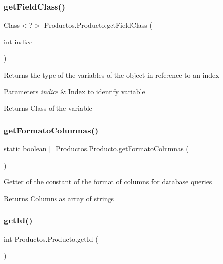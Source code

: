\subsubsection{\texorpdfstring{get\+Field\+Class()}{getFieldClass()}}
{\footnotesize\ttfamily Class$<$?$>$ Productos.\+Producto.\+get\+Field\+Class (\begin{DoxyParamCaption}\item[{int}]{indice }\end{DoxyParamCaption})}

Returns the type of the variables of the object in reference to an index


\begin{DoxyParams}{Parameters}
{\em indice} & Index to identify variable \\
\hline
\end{DoxyParams}
\begin{DoxyReturn}{Returns}
Class of the variable 
\end{DoxyReturn}
\mbox{\label{class_productos_1_1_producto_a1a5e9f3b94441b04e3e074f25648c188}} 
\subsubsection{\texorpdfstring{get\+Formato\+Columnas()}{getFormatoColumnas()}}
{\footnotesize\ttfamily static boolean \mbox{[}$\,$\mbox{]} Productos.\+Producto.\+get\+Formato\+Columnas (\begin{DoxyParamCaption}{ }\end{DoxyParamCaption})\hspace{0.3cm}{\ttfamily [static]}}

Getter of the constant of the format of columns for database queries

\begin{DoxyReturn}{Returns}
Columns as array of strings 
\end{DoxyReturn}
\mbox{\label{class_productos_1_1_producto_ad91315ab5e1fe2699a805125e5c50e2c}} 
\subsubsection{\texorpdfstring{get\+Id()}{getId()}}
{\footnotesize\ttfamily int Productos.\+Producto.\+get\+Id (\begin{DoxyParamCaption}{ }\end{DoxyParamCaption})}

